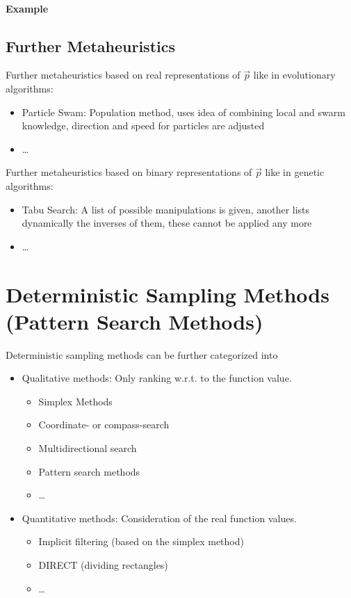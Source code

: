 			\paragraph{Example} %

		\subsection{Further Metaheuristics}
			Further metaheuristics based on real representations of \(\vec{p}\) like in evolutionary algorithms:
			\begin{itemize}
				\item Particle Swam: Population method, uses idea of combining local and swarm knowledge, direction and speed for particles are adjusted
				\item \dots
			\end{itemize}
		
			Further metaheuristics based on binary representations of \(\vec{p}\) like in genetic algorithms:
			\begin{itemize}
				\item Tabu Search: A list of possible manipulations is given, another lists dynamically the inverses of them, these cannot be applied any more
				\item \dots
			\end{itemize}

	\section{Deterministic Sampling Methods (Pattern Search Methods)}
		Deterministic sampling methods can be further categorized into
		\begin{itemize}
			\item Qualitative methods: Only ranking w.r.t. to the function value.
				\begin{itemize}
					\item Simplex Methods
					\item Coordinate- or compass-search
					\item Multidirectional search
					\item Pattern search methods
					\item \dots
				\end{itemize}
			\item Quantitative methods: Consideration of the real function values.
				\begin{itemize}
					\item Implicit filtering (based on the simplex method)
					\item DIRECT (dividing rectangles)
					\item \dots
				\end{itemize}
		\end{itemize}

